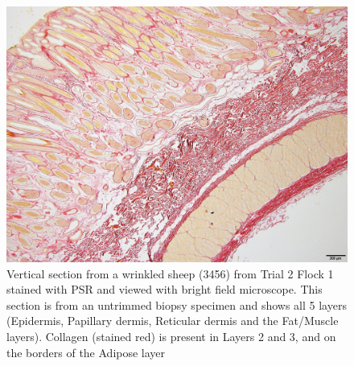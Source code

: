 %

\begin{figure}[!h]
  \centering
  \includegraphics[width=1.0\textwidth]{3456_4layers_4x_PSR.jpg}
  \caption{Vertical section from a wrinkled sheep (3456) from Trial 2 Flock 1 stained with PSR and viewed with bright field microscope. This section is from an untrimmed biopsy specimen and shows all 5 layers (Epidermis, Papillary dermis, Reticular dermis and the Fat/Muscle layers). Collagen (stained red) is present in Layers 2 and 3, and on the borders of the Adipose layer}
  \label{fig:trial2psr}
\end{figure}

%

